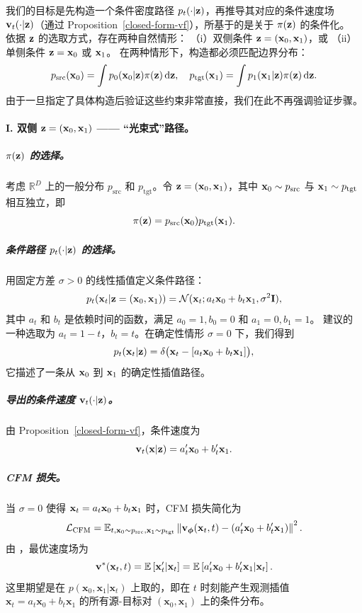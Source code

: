 我们的目标是先构造一个条件密度路径 $p_t(\cdot|{\mathbf{z}})$，再推导其对应的条件速度场 ${\mathbf{v}}_t(\cdot|{\mathbf{z}})$（通过 Proposition~\ref{closed-form-vf}），所基于的是关于 $\pi({\mathbf{z}})$ 的条件化。
依据 ${\mathbf{z}}$ 的选取方式，存在两种自然情形：
（i）双侧条件 ${\mathbf{z}}=({\mathbf{x}}_0,{\mathbf{x}}_1)$，或
（ii）单侧条件 ${\mathbf{z}}={\mathbf{x}}_0$ 或 ${\mathbf{x}}_1$。
在两种情形下，构造都必须匹配边界分布：
\begin{align*}
   p_{\mathrm{src}}({\mathbf{x}}_0) = \int p_0({\mathbf{x}}_0|{\mathbf{z}}) \pi({\mathbf{z}})\mathop{}\!\mathrm{d}{\mathbf{z}}, \quad
   p_{\mathrm{tgt}}({\mathbf{x}}_1) = \int p_1({\mathbf{x}}_1|{\mathbf{z}}) \pi({\mathbf{z}}) \mathop{}\!\mathrm{d}{\mathbf{z}}.
\end{align*}
由于一旦指定了具体构造后验证这些约束非常直接，我们在此不再强调验证步骤。



\paragraph{I. 双侧 ${\mathbf{z}} = ({\mathbf{x}}_0, {\mathbf{x}}_1)$ —— “光束式”路径。}
    \subparagraph{$\pi({\mathbf{z}})$ 的选择。}考虑 $\mathbb{R}^D$ 上的一般分布 $p_{\mathrm{src}}$ 和 $p_{\mathrm{tgt}}$。令 ${\mathbf{z}} = ({\mathbf{x}}_0, {\mathbf{x}}_1)$，其中 ${\mathbf{x}}_0 \sim p_{\mathrm{src}}$ 与 ${\mathbf{x}}_1 \sim p_{\mathrm{tgt}}$ 相互独立，即
    \[
    \pi({\mathbf{z}}) = p_{\mathrm{src}}({\mathbf{x}}_0)  p_{\mathrm{tgt}}({\mathbf{x}}_1).
    \]
    \subparagraph{条件路径 $p_t(\cdot|{\mathbf{z}})$ 的选择。}用固定方差 $\sigma > 0$ 的线性插值定义条件路径：
    \[
    p_t({\mathbf{x}}_t | {\mathbf{z}} = ({\mathbf{x}}_0, {\mathbf{x}}_1)) = \mathcal{N}({\mathbf{x}}_t; a_t{\mathbf{x}}_0 + b_t{\mathbf{x}}_1,  \sigma^2 {\mathbf{I}}),
    \]
    其中 $a_t$ 和 $b_t$ 是依赖时间的函数，满足  $a_0 = 1,  b_0 = 0$ 和 $a_1 = 0,  b_1 = 1$。\citep{lipman2022flow,liu2022rectified} 建议的一种选取为 $a_t = 1-t$，$b_t = t$。在确定性情形 $\sigma = 0$ 下，我们得到
\[
p_t({\mathbf{x}}_t |{\mathbf{z}}) = \delta \big({\mathbf{x}}_t - [a_t{\mathbf{x}}_0 + b_t{\mathbf{x}}_1]\big),
\]
它描述了一条从 ${\mathbf{x}}_0$ 到 ${\mathbf{x}}_1$ 的确定性插值路径。
    \subparagraph{导出的条件速度 ${\mathbf{v}}_t(\cdot|{\mathbf{z}})$。}由 Proposition~\ref{closed-form-vf}，条件速度为
    \[
    {\mathbf{v}}_t({\mathbf{x}} | {\mathbf{z}}) = a'_t{\mathbf{x}}_0 + b'_t{\mathbf{x}}_1.
    \]
    \subparagraph{CFM 损失。}当 $\sigma=0$ 使得 ${\mathbf{x}}_t = a_t{\mathbf{x}}_0 + b_t{\mathbf{x}}_1$ 时，CFM 损失简化为
    \[
    \mathcal{L}_{\mathrm{CFM}} = \mathbb{E}_{t, {\mathbf{x}}_0\sim p_{\text{src}}, {\mathbf{x}}_1\sim p_{\text{tgt}}} \left\| {\mathbf{v}}_{\bm{\phi}}({\mathbf{x}}_t, t) - \left(a'_t{\mathbf{x}}_0 + b'_t{\mathbf{x}}_1\right) \right\|^2.
    \]
由 ，最优速度场为
\[
{\mathbf{v}}^*({\mathbf{x}}_t, t) = \mathbb{E} \left[ {\mathbf{x}}_t'|{\mathbf{x}}_t \right] = \mathbb{E} \left[ a'_t{\mathbf{x}}_0 + b'_t{\mathbf{x}}_1|{\mathbf{x}}_t \right].
\]
这里期望是在 $p(\mathbf{x}_0, \mathbf{x}_1|\mathbf{x}_t)$ 上取的，即在 $t$ 时刻能产生观测插值 $\mathbf{x}_t = a_t\mathbf{x}_0 + b_t\mathbf{x}_1$ 的所有源-目标对 $(\mathbf{x}_0, \mathbf{x}_1)$ 上的条件分布。



